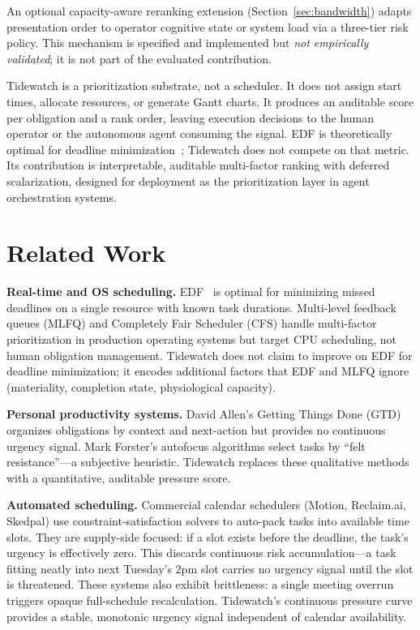 \documentclass[11pt]{article}
\begin{document}
An optional capacity-aware reranking extension
(Section~\ref{sec:bandwidth}) adapts presentation order to operator
cognitive state or system load via a three-tier risk policy.  This
mechanism is specified and implemented but \emph{not empirically
validated}; it is not part of the evaluated contribution.

Tidewatch is a prioritization substrate, not a scheduler.  It does
not assign start times, allocate resources, or generate Gantt
charts.  It produces an auditable score per obligation and a rank
order, leaving execution decisions to the human operator or the
autonomous agent consuming the signal.  EDF is theoretically optimal
for deadline minimization~\citep{liu1973scheduling}; Tidewatch does
not compete on that metric.  Its contribution is interpretable,
auditable multi-factor ranking with deferred scalarization, designed
for deployment as the prioritization layer in agent orchestration
systems.

\section{Related Work}
\label{sec:related}

\textbf{Real-time and OS scheduling.}
EDF~\citep{liu1973scheduling} is optimal for minimizing missed
deadlines on a single resource with known task durations.
Multi-level feedback queues (MLFQ) and Completely Fair Scheduler
(CFS) handle multi-factor prioritization in production operating
systems but target CPU scheduling, not human obligation management.
Tidewatch does not claim to improve on EDF for deadline
minimization; it encodes additional factors that EDF and MLFQ
ignore (materiality, completion state, physiological capacity).

\textbf{Personal productivity systems.}
David Allen's Getting Things Done (GTD) organizes obligations by
context and next-action but provides no continuous urgency signal.
Mark Forster's autofocus algorithms select tasks by ``felt
resistance''---a subjective heuristic.  Tidewatch replaces these
qualitative methods with a quantitative, auditable pressure score.

\textbf{Automated scheduling.}
Commercial calendar schedulers (Motion, Reclaim.ai, Skedpal) use
constraint-satisfaction solvers to auto-pack tasks into available
time slots.  They are supply-side focused: if a slot exists before
the deadline, the task's urgency is effectively zero.  This discards
continuous risk accumulation---a task fitting neatly into next
Tuesday's 2pm slot carries no urgency signal until the slot is
threatened.  These systems also exhibit brittleness: a single
meeting overrun triggers opaque full-schedule recalculation.
Tidewatch's continuous pressure curve provides a stable, monotonic
urgency signal independent of calendar availability.
\end{document}
